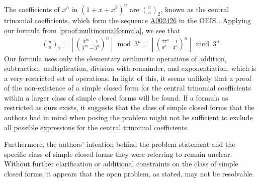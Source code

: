 \documentclass{article}
\theoremstyle{plain}
\theoremstyle{definition}
\newcommand{\floor}[1]{\left\lfloor #1 \right\rfloor}
\newcommand{\seqnum}[1]{\href{https://oeis.org/#1}{\rm \underline{#1}}}
\begin{document}
The coefficients of $x^n$ in $(1+x+x^2)^n$ are $\binom{n}{n}_2$, known as the central trinomial coefficients, which form the sequence \seqnum{A002426} in the OEIS \cite{A002426}. Applying our formula from \cref{proof:multinomialformula}, we see that
\begin{align*}
    \binom{n}{n}_2 = \floor{\left(\frac{3^{3n} - 1}{3^{2n} - 3^n}\right)^n} \bmod 3^n
    = \floor{\left(\frac{27^{n} - 1}{9^{n} - 3^n}\right)^n} \bmod 3^n
\end{align*}
Our formula uses only the elementary arithmetic operations of addition, subtraction, multiplication, division with remainder, and exponentiation, which is a very restricted set of operations. In light of this, it seems unlikely that a proof of the non-existence of a simple closed form for the central trinomial coefficients within a larger class of simple closed forms will be found. If a formula as restricted as ours exists, it suggests that the class of simple closed forms that the authors had in mind when posing the problem might not be sufficient to exclude all possible expressions for the central trinomial coefficients.

Furthermore, the authors' intention behind the problem statement and the specific class of simple closed forms they were referring to remain unclear. Without further clarification or additional constraints on the class of simple closed forms, it appears that the open problem, as stated, may not be resolvable.

\begingroup
\raggedright


\endgroup
\end{document}
